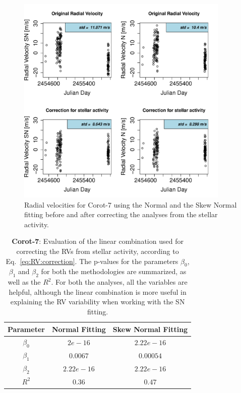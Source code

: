 \documentclass[11pt, oneside]{article}
\begin{document}
\begin{figure}[htbp]
   \centering
\includegraphics[height = 4in]{LRa01_E_[3]CorrectionActivity_RadialVelocity_vs_time.pdf} 
   \caption{Radial velocities for Corot-7 using the Normal and the Skew Normal fitting before and after correcting the analyses from the stellar activity.}
   \label{fig:Corot7:correctionRV}
\end{figure}

\begin{table}[!t]
\begin{tabular}{|c|c|c|}
\hline
Parameter          & Normal Fitting         &   Skew Normal Fitting \\
\hline
$\beta_{0}$            &    $2e-16$    & $2.22e-16$ \\
\hline
$\beta_{1}$            &    $0.0067$    & $0.00054$ \\
\hline
$\beta_{2}$            &     $2.22e-16$   &  $2.22e-16$ \\
\hline
$R^{2}$      &     $0.36$    &  $0.47$   \\
\hline
\end{tabular}
\caption{\textbf{Corot-7}: Evaluation of the linear combination used for correcting the RVs from stellar activity, according to Eq.~\ref{eq:RV:correction}. The p-values for the parameters $\beta_{0}$, $\beta_{1}$ and $\beta_{2}$ for both the methodologies are summarized, as well as the $R^2$. For both the analyses, all the variables are helpful, although the linear combination is more useful in explaining the RV variability when working with the SN fitting.}
\label{table:Corot7:test}
\end{table}
\end{document}
